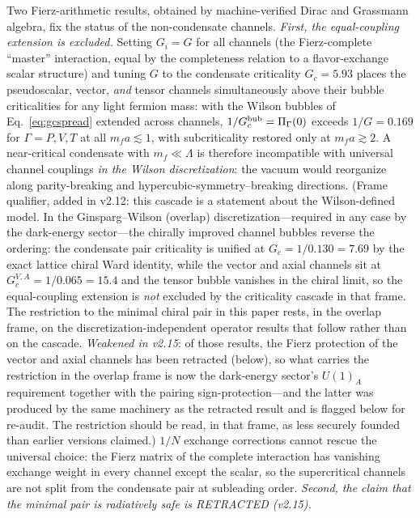 \documentclass[11pt,a4paper]{article}
\begin{document}
Two Fierz-arithmetic results, obtained by machine-verified Dirac
and Grassmann algebra, fix the status of the non-condensate
channels.
\emph{First, the equal-coupling extension is excluded.}
Setting $G_i = G$ for all channels (the Fierz-complete
``master'' interaction, equal by the completeness relation to a
flavor-exchange scalar structure) and tuning $G$ to the
condensate criticality $G_c = 5.93$ places the pseudoscalar,
vector, \emph{and} tensor channels simultaneously above their
bubble criticalities for any light fermion mass: with the
Wilson bubbles of Eq.~\eqref{eq:gcspread} extended
across channels, $1/G_c^{\rm bub} = \Pi_\Gamma(0)$ exceeds
$1/G = 0.169$ for $\Gamma = P, V, T$ at all $m_f a \lesssim 1$,
with subcriticality restored only at $m_f a \gtrsim 2$.
A near-critical condensate with $m_f \ll \Lambda$ is therefore
incompatible with universal channel couplings \emph{in the Wilson
discretization}: the vacuum would reorganize along parity-breaking
and hypercubic-symmetry--breaking directions.
(Frame qualifier, added in v2.12: this cascade is a statement about
the Wilson-defined model.  In the Ginsparg--Wilson (overlap)
discretization---required in any case by the dark-energy
sector---the chirally improved channel bubbles reverse the
ordering: the condensate pair criticality is unified at
$G_c = 1/0.130 = 7.69$ by the exact lattice chiral Ward identity,
while the vector and axial channels sit at
$G_c^{V,A} = 1/0.065 = 15.4$ and the tensor bubble vanishes in the
chiral limit, so the equal-coupling extension is \emph{not}
excluded by the criticality cascade in that frame.  The
restriction to the minimal chiral pair in this paper rests, in the
overlap frame, on the discretization-independent operator results
that follow rather than on the cascade.
\emph{Weakened in v2.15}: of those results, the Fierz protection
of the vector and axial channels has been retracted (below), so
what carries the restriction in the overlap frame is now the
dark-energy sector's $U(1)_A$ requirement together with the
pairing sign-protection---and the latter was produced by the same
machinery as the retracted result and is flagged below for
re-audit.  The restriction should be read, in that frame, as less
securely founded than earlier versions claimed.)
$1/N$ exchange corrections cannot rescue the universal choice:
the Fierz matrix of the complete interaction has vanishing
exchange weight in every channel except the scalar, so the
supercritical channels are not split from the condensate pair at
subleading order.
\emph{Second, the claim that the minimal pair is radiatively safe
is RETRACTED (v2.15).}
\end{document}
